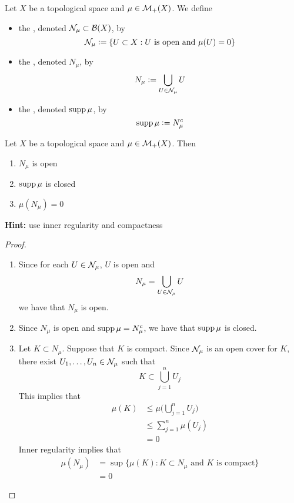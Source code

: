 \documentclass{book}
\begin{document}
	\begin{defn} 
		Let $X$ be a topological space and $\mu \in \mathcal{M}_+(X)$. We define 
		\begin{itemize}
			\item the , denoted $\mathcal{N}_{\mu} \subset \mathcal{B}(X)$, by 
			$$\mathcal{N}_{\mu} \vcentcolon= \{U \subset X: U \text{ is open and } \mu(U) = 0\}$$ 
			\item the , denoted $N_{\mu}$, by 
			$$N_{\mu} \vcentcolon= \bigcup_{U \in \mathcal{N}_{\mu}} U $$
			\item the , denoted $\operatorname{supp} \mu$, by 
			$$\operatorname{supp} \mu \vcentcolon= N_{\mu}^c$$ 
		\end{itemize}
	\end{defn}

	\begin{ex}  
		Let $X$ be a topological space and $\mu \in \mathcal{M}_+(X)$. Then 
		\begin{enumerate}
			\item $N_{\mu}$ is open
			\item $\operatorname{supp} \mu$ is closed
			\item $\mu(N_{\mu}) = 0$
		\end{enumerate}
		\textbf{Hint:} use inner regularity and compactness
	\end{ex}
	
	\begin{proof}\
		\begin{enumerate}
			\item Since for each $U \in \mathcal{N}_{\mu}$, $U$ is open and 
			$$N_{\mu} = \bigcup_{U \in \mathcal{N}_{\mu}} U $$
			we have that $N_{\mu}$ is open.  
			\item Since $N_{\mu}$ is open and $\operatorname{supp} \mu = N_{\mu}^c$, we have that $\operatorname{supp} \mu$ is closed.  
			\item Let $K \subset N_{\mu}$. Suppose that $K$ is compact. Since $\mathcal{N}_{\mu}$ is an open cover for $K$, there exist $U_1, \ldots, U_n \in \mathcal{N}_{\mu}$ such that $$K \subset \bigcup_{j=1}^n U_j$$ 
			This implies that 
			\begin{align*}
				\mu(K) 
				&\leq \mu\bigg( \bigcup_{j=1}^n U_j \bigg) \\
				& \leq \sum_{j=1}^n \mu(U_j) \\
				&= 0
			\end{align*}
			Inner regularity implies that 
			\begin{align*}
				\mu(N_{\mu}) 
				&= \sup \{ \mu(K): K \subset N_{\mu} \text{ and $K$ is compact}\} \\
				&= 0
			\end{align*}
		\end{enumerate}
	\end{proof}
\end{document}
